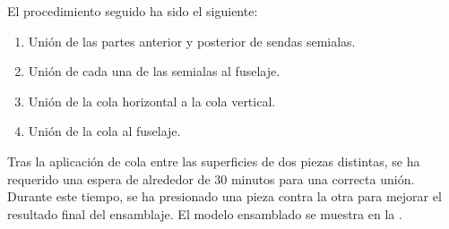El procedimiento seguido ha sido el siguiente:
\begin{enumerate}
\item Unión de las partes anterior y posterior de sendas semialas.
\item Unión de cada una de las semialas al fuselaje.
\item Unión de la cola horizontal a la cola vertical.
\item Unión de la cola al fuselaje.
\end{enumerate}

Tras la aplicación de cola entre las superficies de dos piezas distintas, se ha requerido una espera de alrededor de 30 minutos para una correcta unión. Durante este tiempo, se ha presionado una pieza contra la otra para mejorar el resultado final del ensamblaje. El modelo ensamblado se muestra en la .
